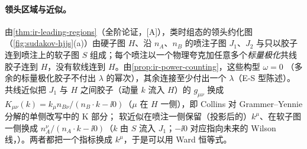 \paragraph{领头区域与近似。}由\cref{thm:ir-leading-regions}（全阶论证，[A]），类时组态的领头约化图（\cref{fig:sudakov-hjjs}(a)）由硬子图 $H$、沿 $n_A$、$n_B$ 的喷注子图 $J_1$、$J_2$
与只以胶子连到喷注上的软子图 $S$ 组成；每个喷注以一个物理夸克加任意多个\emph{标量极化}共线胶子连到 $H$，没有软线连到 $H$。由\cref{prop:ir-power-counting}，这些构型 $\omega=0$
（多余的标量极化胶子不付出 $\lambda$ 的幂次），其余连接至少付出一个 $\lambda$（E-S 型陈述）。共线近似把 $J_1$ 与 $H$ 之间胶子（动量 $k$ 流入 $H$）的 $g_{\mu\nu}$ 换成
$K_{\mu\nu}(k)=k_\mu n_{B\nu}/(n_B\cdot k-\ii0)$（$\mu$ 在 $H$ 一侧），即 Collins 对 Grammer--Yennie 分解\cite{GrammerYennie1973}的单侧改写中的 K 部分\cite[式~(10.23)，第~10.6~节]{Collins2011}；
软近似在喷注一侧保留（投影后的）$k^\mu$、在软子图一侧换成 $n_A^\nu/(n_A\cdot k-\ii0)$（$k$ 由 $S$ 流入 $J_1$；$-\ii0$ 对应指向未来的 Wilson 线，\cite[式~(10.20)、(10.68)]{Collins2011}）。两者都把一个指标换成 $k^\mu$，于是可以用 Ward 恒等式。

